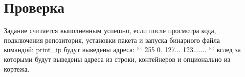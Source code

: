 \section*{Проверка}

Задание считается выполненным успешно, если после просмотра кода, подключения репозитория, установки пакета и запуска бинарного файла командой\-: {\ttfamily  print\-\_\-ip} будут выведены адреса\-: ``` 255 0. 127... 123....... ``` вслед за которыми будут выведены адреса из строки, контейнеров и опционально из кортежа. 